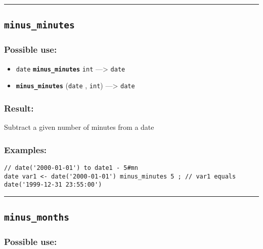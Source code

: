 \documentclass[]{book}
\providecommand{\tightlist}{%
  \setlength{\itemsep}{0pt}\setlength{\parskip}{0pt}}
\theoremstyle{definition}
\theoremstyle{definition}
\theoremstyle{definition}
\theoremstyle{remark}
\begin{document}
\begin{center}\rule{0.5\linewidth}{\linethickness}\end{center}

\subsection{\texorpdfstring{\texttt{minus\_minutes}}{minus\_minutes}}\label{minus_minutes}

\subsubsection{Possible use:}\label{possible-use-355}

\begin{itemize}
\tightlist
\item
  \texttt{date} \textbf{\texttt{minus\_minutes}} \texttt{int}
  ---\textgreater{} \texttt{date}
\item
  \textbf{\texttt{minus\_minutes}} (\texttt{date} , \texttt{int})
  ---\textgreater{} \texttt{date}
\end{itemize}

\subsubsection{Result:}\label{result-344}

Subtract a given number of minutes from a date

\subsubsection{Examples:}\label{examples-245}

\begin{verbatim}
// date('2000-01-01') to date1 - 5#mn  
date var1 <- date('2000-01-01') minus_minutes 5 ; // var1 equals date('1999-12-31 23:55:00')
\end{verbatim}

\begin{center}\rule{0.5\linewidth}{\linethickness}\end{center}

\subsection{\texorpdfstring{\texttt{minus\_months}}{minus\_months}}\label{minus_months}

\subsubsection{Possible use:}\label{possible-use-356}
\end{document}
